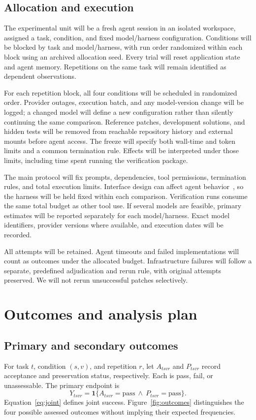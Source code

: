 \documentclass[11pt,a4paper]{article}
\begin{document}
\subsection{Allocation and execution}
The experimental unit will be a fresh agent session in an isolated workspace, assigned a task, condition, and fixed model/harness configuration. Conditions will be blocked by task and model/harness, with run order randomized within each block using an archived allocation seed. Every trial will reset application state and agent memory. Repetitions on the same task will remain identified as dependent observations.

For each repetition block, all four conditions will be scheduled in randomized order. Provider outages, execution batch, and any model-version change will be logged; a changed model will define a new configuration rather than silently continuing the same comparison. Reference patches, development solutions, and hidden tests will be removed from reachable repository history and external mounts before agent access. The freeze will specify both wall-time and token limits and a common termination rule. Effects will be interpreted under those limits, including time spent running the verification package.

The main protocol will fix prompts, dependencies, tool permissions, termination rules, and total execution limits. Interface design can affect agent behavior~\cite{yang2024sweagent}, so the harness will be held fixed within each comparison. Verification runs consume the same total budget as other tool use. If several models are feasible, primary estimates will be reported separately for each model/harness. Exact model identifiers, provider versions where available, and execution dates will be recorded.

All attempts will be retained. Agent timeouts and failed implementations will count as outcomes under the allocated budget. Infrastructure failures will follow a separate, predefined adjudication and rerun rule, with original attempts preserved. We will not rerun unsuccessful patches selectively.

\section{Outcomes and analysis plan}
\subsection{Primary and secondary outcomes}
For task $t$, condition $(s,v)$, and repetition $r$, let $A_{tsvr}$ and $P_{tsvr}$ record acceptance and preservation status, respectively. Each is pass, fail, or unassessable. The primary endpoint is
\begin{equation}\label{eq:joint}
Y_{tsvr}=\mathbf{1}\{A_{tsvr}=\mathrm{pass}\ \land\ P_{tsvr}=\mathrm{pass}\}.
\end{equation}
Equation~\eqref{eq:joint} defines joint success. Figure~\ref{fig:outcomes} distinguishes the four possible assessed outcomes without implying their expected frequencies.
\end{document}
